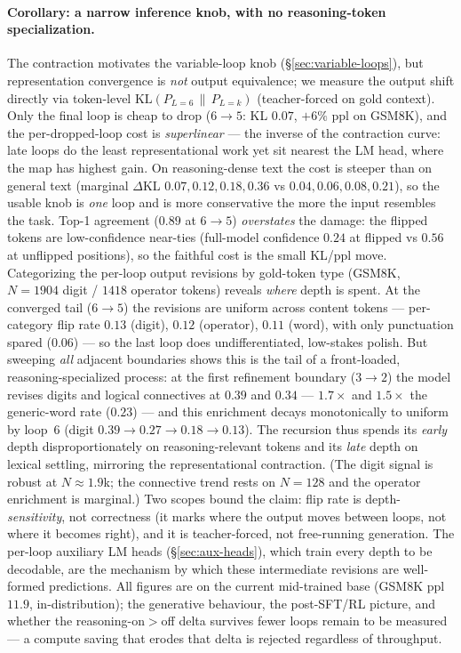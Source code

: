 \paragraph{Corollary: a narrow inference knob, with no reasoning-token
specialization.} The contraction motivates the variable-loop knob
(\S\ref{sec:variable-loops}), but representation convergence is \emph{not}
output equivalence; we measure the output shift directly via token-level
$\mathrm{KL}\!\left(P_{L=6}\,\|\,P_{L=k}\right)$ (teacher-forced on gold context).
Only the final loop is cheap to drop ($6\!\to\!5$: KL $0.07$, $+6\%$ ppl on
GSM8K), and the per-dropped-loop cost is \emph{superlinear} --- the inverse of
the contraction curve: late loops do the least representational work yet sit
nearest the LM head, where the map has highest gain. On reasoning-dense text the
cost is steeper than on general text (marginal $\Delta$KL
$0.07,0.12,0.18,0.36$ vs $0.04,0.06,0.08,0.21$), so the usable knob is
\emph{one} loop and is more conservative the more the input resembles the task.
Top-1 agreement ($0.89$ at $6\!\to\!5$) \emph{overstates} the damage: the flipped
tokens are low-confidence near-ties (full-model confidence $0.24$ at flipped vs
$0.56$ at unflipped positions), so the faithful cost is the small KL/ppl move.
Categorizing the per-loop output revisions by gold-token type (GSM8K,
$N\!=\!1904$ digit / $1418$ operator tokens) reveals \emph{where} depth is spent.
At the converged tail ($6\!\to\!5$) the revisions are uniform across content
tokens --- per-category flip rate $0.13$ (digit), $0.12$ (operator), $0.11$
(word), with only punctuation spared ($0.06$) --- so the last loop does
undifferentiated, low-stakes polish. But sweeping \emph{all} adjacent boundaries
shows this is the tail of a front-loaded, reasoning-specialized process: at the
first refinement boundary ($3\!\to\!2$) the model revises digits and logical
connectives at $0.39$ and $0.34$ --- $1.7\times$ and $1.5\times$ the generic-word
rate ($0.23$) --- and this enrichment decays monotonically to uniform by loop~6
(digit $0.39\!\to\!0.27\!\to\!0.18\!\to\!0.13$). The recursion thus spends its
\emph{early} depth disproportionately on reasoning-relevant tokens and its
\emph{late} depth on lexical settling, mirroring the representational
contraction. (The digit signal is robust at $N\!\approx\!1.9$k; the connective
trend rests on $N\!=\!128$ and the operator enrichment is marginal.) Two scopes
bound the claim: flip rate is depth-\emph{sensitivity}, not correctness (it marks
where the output moves between loops, not where it becomes right), and it is
teacher-forced, not free-running generation. The per-loop auxiliary LM heads
(\S\ref{sec:aux-heads}), which train every depth to be decodable, are the
mechanism by which these intermediate revisions are well-formed predictions.
All figures are on the current mid-trained base (GSM8K ppl $11.9$,
in-distribution); the generative behaviour, the post-SFT/RL picture, and whether
the reasoning-on$>$off delta survives fewer loops remain to be measured --- a
compute saving that erodes that delta is rejected regardless of throughput.

